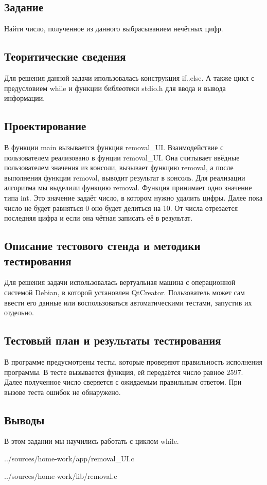 \documentclass[12pt,a4paper]{report}
\begin{document}
\subsection{Задание}
Найти число, полученное из данного выбрасыванием нечётных цифр.
\subsection{Теоритические сведения}
Для решения данной задачи ипользовалась конструкция if..else. А также цикл с предусловием while и функции библеотеки stdio.h для ввода и вывода информации.
\subsection{Проектирование}
В функции main вызывается функция removal\_UI. Взаимодействие с пользователем реализовано в фунции removal\_UI. Она считывает ввёдные пользователем значения из консоли, вызывает функцию removal, а после выполнения функции removal, выводит результат в консоль. Для реализации алгоритма мы выделили функцию removal. Функция принимает одно значение типа int. Это значение задаёт число, в котором нужно удалить цифры. Далее пока число не будет равняться 0 оно будет делиться на 10. От числа отрезается последняя цифра и если она чётная записать её в результат.
\subsection{Описание тестового стенда и методики тестирования}
Для решения задачи использовалась вертуальная машина с операционной системой Debian, в которой установлен QtCreator. 
Пользователь может сам ввести его данные или воспользоваться автоматическими тестами, запустив их отдельно.
\subsection{Тестовый план и результаты тестирования}
В программе предусмотрены тесты, которые проверяют правильность исполнения программы. В тесте вызывается функция, ей передаётся число равное 2597. Далее полученное число сверяется с ожидаемым правильным ответом. При вызове теста ошибок не обнаружено.
\subsection{Выводы}
В этом задании мы научились работать с циклом while.

{../sources/home-work/app/removal_UI.c}


{../sources/home-work/lib/removal.c}
\end{document}

